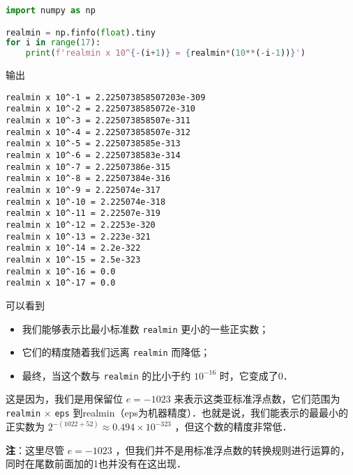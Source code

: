 \begin{lstlisting}[language=python]
import numpy as np

realmin = np.finfo(float).tiny
for i in range(17):
    print(f'realmin x 10^{-(i+1)} = {realmin*(10**(-i-1))}')
\end{lstlisting}

输出

\begin{lstlisting}[language=pythonC]
realmin x 10^-1 = 2.225073858507203e-309
realmin x 10^-2 = 2.2250738585072e-310
realmin x 10^-3 = 2.225073858507e-311
realmin x 10^-4 = 2.225073858507e-312
realmin x 10^-5 = 2.2250738585e-313
realmin x 10^-6 = 2.2250738583e-314
realmin x 10^-7 = 2.22507386e-315
realmin x 10^-8 = 2.22507384e-316
realmin x 10^-9 = 2.225074e-317
realmin x 10^-10 = 2.225074e-318
realmin x 10^-11 = 2.22507e-319
realmin x 10^-12 = 2.2253e-320
realmin x 10^-13 = 2.223e-321
realmin x 10^-14 = 2.2e-322
realmin x 10^-15 = 2.5e-323
realmin x 10^-16 = 0.0
realmin x 10^-17 = 0.0
\end{lstlisting}

可以看到

\begin{itemize}
\item 我们能够表示比最小标准数 \verb|realmin| 更小的一些正实数；
\item 它们的精度随着我们远离 \verb|realmin| 而降低；
\item 最终，当这个数与 \verb|realmin| 的比小于约  $10^{-16}$  时，它变成了0．
\end{itemize}
这是因为，我们是用保留位  $e=-1023$  来表示这类亚标准浮点数，它们范围为 \verb|realmin|   $\times$   \verb|eps| 到realmin（eps为机器精度）．也就是说，我们能表示的最最小的正实数为  $2^{-(1022+52)}\approx 0.494\times10^{-323}$  ，但这个数的精度非常低．

\textbf{注}：这里尽管  $e=-1023$  ，但我们并不是用标准浮点数的转换规则进行运算的，同时在尾数前面加的1也并没有在这出现．
